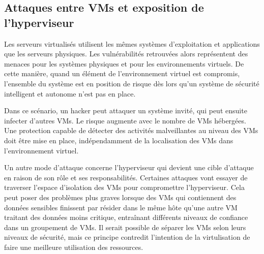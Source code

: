 \subsection{Attaques entre VMs et exposition de l'hyperviseur}

Les serveurs virtualisés utilisent les mêmes systèmes d'exploitation et applications que les serveurs physiques. Les vulnérabilités retrouvées alors représentent des menaces pour les systèmes physiques et pour les environnements virtuels. De cette manière, quand un élément de l'environnement virtuel est compromis, l'ensemble du système est en position de risque dès lors qu'un système de sécurité intelligent et autonome n'est pas en place. 

Dans ce scénario, un hacker peut attaquer un système invité, qui peut ensuite infecter d'autres VMs. Le risque augmente avec le nombre de VMs hébergées. Une protection capable de détecter des activités malveillantes au niveau des VMs doit être mise en place, indépendamment de la localisation des VMs dans l'environnement virtuel.

Un autre mode d'attaque concerne l'hyperviseur qui devient une cible d'attaque en raison de son rôle et ses responsabilités. Certaines attaques vont essayer de traverser l'espace d'isolation des VMs pour compromettre l'hyperviseur. Cela peut poser des problèmes plus graves lorsque des VMs qui contiennent des données sensibles finissent par résider dans le même hôte qu'une autre VM traitant des données moins critique, entraînant différents niveaux de confiance dans un groupement de VMs. Il serait possible de séparer les VMs selon leurs niveaux de sécurité, mais ce principe contredit l'intention de la virtulisation de faire une meilleure utilisation des ressources. 

